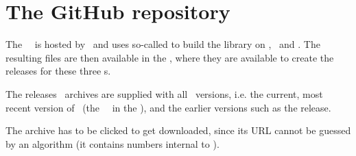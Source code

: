 



\section{The GitHub repository}\label{The GitHub repository}

The \mf\ \repo\ is hosted by \github\ and uses so-called  to build the library on \MacOS, \Ubuntu\ and \Windows. The resulting files are then available in the \repo, where they are available to create the releases for these three \OS s.

The releases \zip\ archives are supplied with all \mf\ versions, i.e. the current, most recent version of \mf\ (the \ \masterBranch\ in the \repo), and the earlier versions such as the  release.


The  archive has to be clicked to get downloaded, since its URL cannot be guessed by an algorithm (it contains numbers internal to \github).


